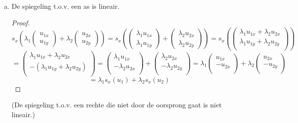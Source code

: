 \documentclass[lineaire_algebra_oplossingen.tex]{subfiles}
\begin{document}
\begin{enumerate}
\begin{enumerate}[a)]
\begin{proof}
\[\]
\[
=
\lambda_1p_x(u_1) + \lambda_2p_x(u_2)
\]
\end{proof}
\item De spiegeling t.o.v. een as is lineair.
\begin{proof}
\[
s_x \left(\lambda_1
\begin{pmatrix}
u_{1x}\\u_{1y}
\end{pmatrix} 
+ \lambda_2
\begin{pmatrix}
u_{2x}\\u_{2y}
\end{pmatrix} \right)
 = 
s_x \left(
\begin{pmatrix}
\lambda_1u_{1x}\\\lambda_1u_{1y}
\end{pmatrix} 
+ 
\begin{pmatrix}
\lambda_2u_{2x}\\\lambda_2u_{2y}
\end{pmatrix} \right)
=
s_x \left(
\begin{pmatrix}
\lambda_1u_{1x}+\lambda_2u_{2x}\\\lambda_1u_{1y}+\lambda_2u_{2y}\\
\end{pmatrix} \right)
\]
\[
= 
\begin{pmatrix}
\lambda_1u_{1x}+\lambda_2u_{2x}\\-(\lambda_1u_{1y}+\lambda_2u_{2y})\\
\end{pmatrix} 
=
\begin{pmatrix}
\lambda_1u_{1x}\\-\lambda_2u_{2x}\\
\end{pmatrix}
+
\begin{pmatrix}
\lambda_2u_{2x}\\-\lambda_2u_{2y}\\
\end{pmatrix}
=
\lambda_1
\begin{pmatrix}
u_{1x}\\-u_{2x}\\
\end{pmatrix}
+
\lambda_2
\begin{pmatrix}
u_{2x}\\-u_{2y}\\
\end{pmatrix}
\]
\[
=
\lambda_1s_x(u_1) + \lambda_2s_x(u_2)
\]
\end{proof}
(De spiegeling t.o.v. een rechte die niet door de oorsprong gaat is niet lineair.)

\end{enumerate}
\end{enumerate}
\end{document}
